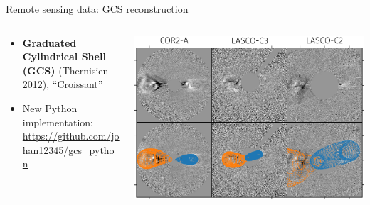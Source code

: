 \documentclass[10pt,aspectratio=169,usenames,dvipsnames]{beamer}
\begin{document}
\begin{frame}{Remote sensing data: GCS reconstruction}
    \begin{columns}
        \begin{column}{0.4\textwidth}
            \begin{itemize}
                \item \textbf{Graduated Cylindrical Shell (GCS)} (Thernisien 2012), ``Croissant''
                \item New Python implementation:\\[-1mm] {\scriptsize\url{https://github.com/johan12345/gcs_python}}
            \end{itemize}
            \centering
            
        \end{column}
        \begin{column}{0.5\textwidth}
            \centering
            \includegraphics[width=\textwidth]{plots/gcs_reconstruction.pdf}
        \end{column}
    \end{columns}
\end{frame}
\end{document}
